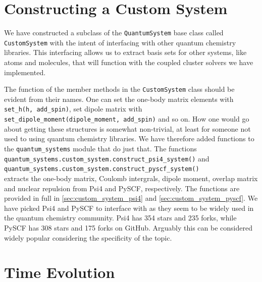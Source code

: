 \section{Constructing a Custom System}

\begin{figure}

\end{figure}

We have constructed a subclass of the \lstinline{QuantumSystem} base 
class called \lstinline{CustomSystem} with the intent of interfacing with 
other quantum chemistry libraries. This interfacing allows us to extract basis 
sets for other systems, like atoms and molecules, that will function with the
coupled cluster solvers we have implemented.

The function of the member methods in the \lstinline{CustomSystem} class
should be evident from their names. One can set the one-body matrix elements with 
\lstinline{set_h(h, add_spin)}, set dipole matrix with 
\lstinline{set_dipole_moment(dipole_moment, add_spin)} and so on. How one would go about 
getting these structures is somewhat non-trivial, at least for someone not used 
to using quantum chemistry libraries. We have therefore added functions 
to the \lstinline{quantum_systems} module that do just that. The functions \\
\indent\lstinline{quantum_systems.custom_system.construct_psi4_system()} and \\
\indent\lstinline{quantum_systems.custom_system.construct_pyscf_system()} \\
extracts the one-body matrix, Coulomb intergrals, dipole moment, overlap matrix and
nuclear repulsion from Psi4\cite{parrish2017psi4} and PySCF\cite{PYSCF}, respectively.
The functions are provided in full in \autoref{sec:custom_system_psi4} and 
\autoref{sec:custom_system_pyscf}.
We have picked Psi4 and PySCF to interface with as they seem to be widely used in the 
quantum chemistry community. Psi4 has 354 stars and 235 forks, while PySCF has 308 stars
and 175 forks on GitHub. Arguably this can be considered  widely popular considering 
the specificity of the topic.

\begin{figure}

\end{figure}

\section{Time Evolution}

